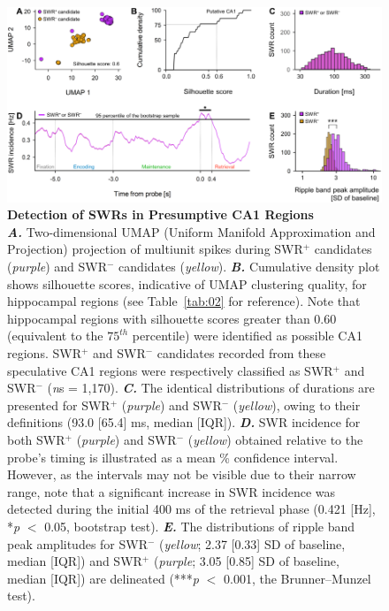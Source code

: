 \documentclass[final,3p,times,twocolumn]{elsarticle}
\begin{document}
        \begin{figure}[ht]
        	\centering
            \includegraphics[width=1\textwidth]{./src/figures/.png/Figure_ID_04.png}
        	\caption{\textbf{
Detection of SWRs in Presumptive CA1 Regions
}
\smallskip
\\
\textbf{\textit{A.}} Two-dimensional UMAP (Uniform Manifold Approximation and Projection) \cite{mcinnes_umap_2018} projection of multiunit spikes during SWR$^+$ candidates (\textit{purple}) and SWR$^-$ candidates (\textit{yellow}). \textbf{\textit{B.}} Cumulative density plot shows silhouette scores, indicative of UMAP clustering quality, for hippocampal regions (see Table~\ref{tab:02} for reference). Note that hippocampal regions with silhouette scores greater than 0.60 (equivalent to the $75^{th}$ percentile) were identified as possible CA1 regions. SWR$^+$ and SWR$^-$ candidates recorded from these speculative CA1 regions were respectively classified as SWR$^+$ and SWR$^-$ (\textit{n}s = 1,170). \textbf{\textit{C.}} The identical distributions of durations are presented for SWR$^+$ (\textit{purple}) and SWR$^-$ (\textit{yellow}), owing to their definitions (93.0 [65.4] ms, median [IQR]). \textbf{\textit{D.}} SWR incidence for both SWR$^+$ (\textit{purple}) and SWR$^-$ (\textit{yellow}) obtained relative to the probe's timing is illustrated as a mean \% confidence interval. However, as the intervals may not be visible due to their narrow range, note that a significant increase in SWR incidence was detected during the initial 400 ms of the retrieval phase (0.421 [Hz], *\textit{p} $<$ 0.05, bootstrap test). \textbf{\textit{E.}} The distributions of ripple band peak amplitudes for SWR$^-$ (\textit{yellow}; 2.37 [0.33] SD of baseline, median [IQR]) and SWR$^+$ (\textit{purple}; 3.05 [0.85] SD of baseline, median [IQR]) are delineated (***\textit{p} $<$ 0.001, the Brunner--Munzel test).
}
        	\label{fig:04}
        \end{figure}
\end{document}
